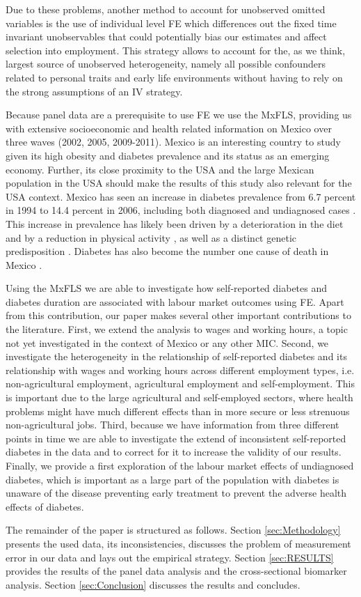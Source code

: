 Due to these problems, another method to account for unobserved omitted variables is
the use of individual level \ac{FE} which differences out
the fixed time invariant unobservables that could potentially bias
our estimates and affect selection into employment. This strategy allows to account for the, as we think, largest source of unobserved heterogeneity, namely all possible confounders related to personal traits and early life environments without having to rely on the strong assumptions of an \ac{IV} strategy.

Because panel data are a prerequisite to use \ac{FE} we use the \ac{MxFLS}, providing us with extensive socioeconomic and health related information on Mexico over three waves (2002, 2005, 2009-2011). Mexico is an interesting country to study given its high obesity and diabetes prevalence and its status as an emerging economy. Further, its close proximity to the USA and the large Mexican population in the USA should make the results of this study also relevant for the USA context. Mexico has seen an increase in diabetes prevalence from 6.7 percent in 1994 to 14.4 percent in 2006, including both diagnosed and undiagnosed cases \citep{Barquera2013}. This increase in prevalence has likely been driven by a deterioration in the diet and by a reduction in physical activity \citep{Barquera2008b,Basu2013}, as well as a distinct genetic predisposition \citep{Williams2013}. Diabetes has also become the number one cause of death in Mexico \cite{23374611}.

Using the \ac{MxFLS} we are able to investigate
how self-reported diabetes and diabetes duration are associated with
labour market outcomes using \ac{FE}. Apart from this contribution, our paper makes
several other important contributions to the literature. First, we
extend the analysis to wages and working hours, a topic not yet investigated
in the context of Mexico or any other \ac{MIC}. Second, we investigate the heterogeneity
in the relationship of self-reported diabetes and its relationship
with wages and working hours across different employment types, i.e.
non-agricultural employment, agricultural employment and self-employment.
This is important due to the large agricultural and self-employed
sectors, where health problems might have much different effects than
in more secure or less strenuous non-agricultural jobs. Third, because
we have information from three different points in time we are able
to investigate the extend of inconsistent self-reported diabetes in
the data and to correct for it to increase the validity of our results.
Finally, we provide a first exploration of the labour market effects
of undiagnosed diabetes, which is important as a large part of the
population with diabetes is unaware of the disease preventing early
treatment to prevent the adverse health effects of diabetes.

The remainder of the paper is structured as follows. Section \ref{sec:Methodology}
presents the used data, its inconsistencies, discusses the problem
of measurement error in our data and lays out the empirical strategy.
Section \ref{sec:RESULTS} provides the results of the panel data
analysis and the cross-sectional biomarker analysis. Section \ref{sec:Conclusion}
discusses the results and concludes.
